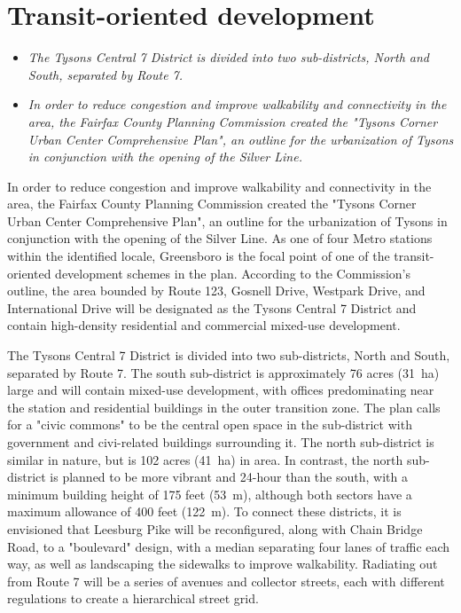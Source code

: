 \section{Transit-oriented
development}\label{transit-oriented-development}

\begin{itemize}
\item
  \emph{The Tysons Central 7 District is divided into two sub-districts,
  North and South, separated by Route 7.}
\item
  \emph{In order to reduce congestion and improve walkability and
  connectivity in the area, the Fairfax County Planning Commission
  created the "Tysons Corner Urban Center Comprehensive Plan", an
  outline for the urbanization of Tysons in conjunction with the opening
  of the Silver Line.}
\end{itemize}

In order to reduce congestion and improve walkability and connectivity
in the area, the Fairfax County Planning Commission created the "Tysons
Corner Urban Center Comprehensive Plan", an outline for the urbanization
of Tysons in conjunction with the opening of the Silver Line. As one of
four Metro stations within the identified locale, Greensboro is the
focal point of one of the transit-oriented development schemes in the
plan. According to the Commission's outline, the area bounded by Route
123, Gosnell Drive, Westpark Drive, and International Drive will be
designated as the Tysons Central 7 District and contain high-density
residential and commercial mixed-use development.

The Tysons Central 7 District is divided into two sub-districts, North
and South, separated by Route 7. The south sub-district is approximately
76 acres (31~ha) large and will contain mixed-use development, with
offices predominating near the station and residential buildings in the
outer transition zone. The plan calls for a "civic commons" to be the
central open space in the sub-district with government and civi-related
buildings surrounding it. The north sub-district is similar in nature,
but is 102 acres (41~ha) in area. In contrast, the north sub-district is
planned to be more vibrant and 24-hour than the south, with a minimum
building height of 175 feet (53~m), although both sectors have a maximum
allowance of 400 feet (122~m). To connect these districts, it is
envisioned that Leesburg Pike will be reconfigured, along with Chain
Bridge Road, to a "boulevard" design, with a median separating four
lanes of traffic each way, as well as landscaping the sidewalks to
improve walkability. Radiating out from Route 7 will be a series of
avenues and collector streets, each with different regulations to create
a hierarchical street grid.

